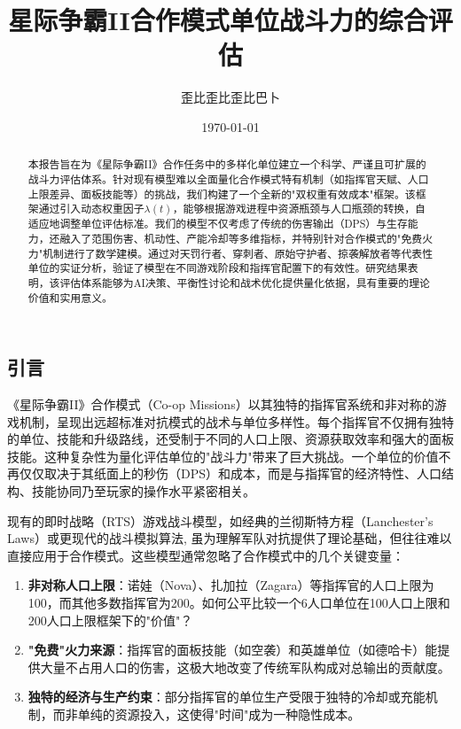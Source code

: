 \documentclass[a4paper,12pt]{article}
\title{\textbf{星际争霸II合作模式单位战斗力的综合评估}}
\author{歪比歪比歪比巴卜}
\date{\today}
\begin{document}
\begin{CJK}{UTF8}{gbsn}

\maketitle

\begin{abstract}
\noindent
本报告旨在为《星际争霸II》合作任务中的多样化单位建立一个科学、严谨且可扩展的战斗力评估体系。针对现有模型难以全面量化合作模式特有机制（如指挥官天赋、人口上限差异、面板技能等）的挑战，我们构建了一个全新的"双权重有效成本"框架。该框架通过引入动态权重因子$\lambda(t)$，能够根据游戏进程中资源瓶颈与人口瓶颈的转换，自适应地调整单位评估标准。我们的模型不仅考虑了传统的伤害输出（DPS）与生存能力，还融入了范围伤害、机动性、产能冷却等多维指标，并特别针对合作模式的"免费火力"机制进行了数学建模。通过对天罚行者、穿刺者、原始守护者、掠袭解放者等代表性单位的实证分析，验证了模型在不同游戏阶段和指挥官配置下的有效性。研究结果表明，该评估体系能够为AI决策、平衡性讨论和战术优化提供量化依据，具有重要的理论价值和实用意义。
\end{abstract}


\section{引言}
《星际争霸II》合作模式（Co-op Missions）以其独特的指挥官系统和非对称的游戏机制，呈现出远超标准对抗模式的战术与单位多样性。每个指挥官不仅拥有独特的单位、技能和升级路线，还受制于不同的人口上限、资源获取效率和强大的面板技能。这种复杂性为量化评估单位的"战斗力"带来了巨大挑战。一个单位的价值不再仅仅取决于其纸面上的秒伤（DPS）和成本，而是与指挥官的经济特性、人口结构、技能协同乃至玩家的操作水平紧密相关。

现有的即时战略（RTS）游戏战斗模型，如经典的兰彻斯特方程（Lanchester's Laws）\cite{lanchester1916}或更现代的战斗模拟算法\cite{uriarte2016}, 虽为理解军队对抗提供了理论基础，但往往难以直接应用于合作模式。这些模型通常忽略了合作模式中的几个关键变量：
\begin{enumerate}
\item \textbf{非对称人口上限}：诺娃（Nova）、扎加拉（Zagara）等指挥官的人口上限为100，而其他多数指挥官为200。如何公平比较一个6人口单位在100人口上限和200人口上限框架下的"价值"？
\item \textbf{"免费"火力来源}：指挥官的面板技能（如空袭）和英雄单位（如德哈卡）能提供大量不占用人口的伤害，这极大地改变了传统军队构成对总输出的贡献度。
\item \textbf{独特的经济与生产约束}：部分指挥官的单位生产受限于独特的冷却或充能机制，而非单纯的资源投入，这使得"时间"成为一种隐性成本。
\end{enumerate}


\end{CJK}
\end{document}

